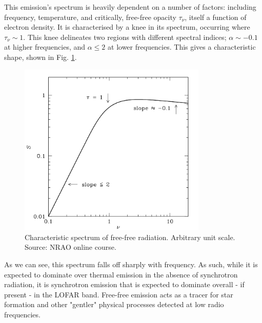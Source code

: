 \pg
This emission's spectrum is heavily dependent on a number of factors: including frequency, temperature, and critically, free-free opacity $\tau_\nu$, itself a function of electron density. It is characterised by a knee in its spectrum, occurring where $\tau_\nu\sim 1$. This knee delineates two regions with different spectral indices; $\alpha \sim -0.1$ at higher frequencies, and $\alpha \leq 2$ at lower frequencies. This gives a characteristic shape, shown in Fig. \ref{plot.freefree.spectrum}.
\begin{figure}[!h]
\centering
\includegraphics[width=0.8\textwidth]{images/freefree.png}
\caption{\label{plot.freefree.spectrum} Characteristic spectrum of free-free radiation. Arbitrary unit scale. Source: NRAO online course.}
\end{figure}

\pg
As we can see, this spectrum falls off sharply with frequency. As such, while it is expected to dominate over thermal emission in the absence of synchrotron radiation, it is synchrotron emission that is expected to dominate overall - if present - in the LOFAR band. Free-free emission acts as a tracer for star formation and other "gentler" physical processes detected at low radio frequencies.
